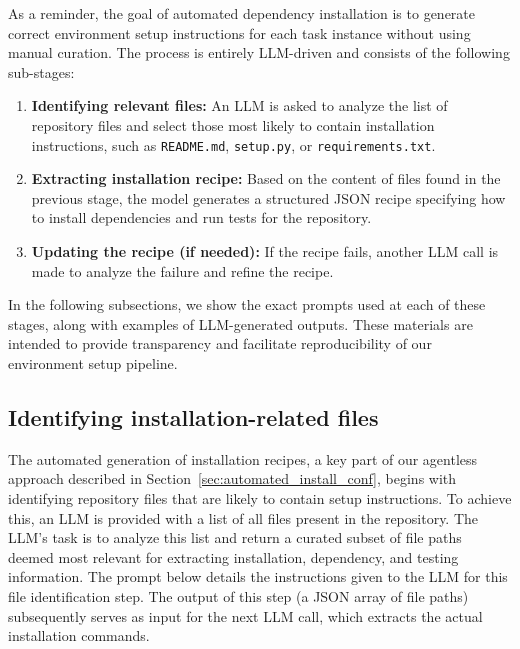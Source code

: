 \documentclass[dandb]{article}
\begin{document}
As a reminder, the goal of automated dependency installation is to generate correct environment setup instructions for each task instance without using manual curation. The process is entirely LLM-driven and consists of the following sub-stages:

\begin{enumerate}
    \item \textbf{Identifying relevant files:} An LLM is asked to analyze the list of repository files and select those most likely to contain installation instructions, such as \texttt{README.md}, \texttt{setup.py}, or \texttt{requirements.txt}.
    \item \textbf{Extracting installation recipe:} Based on the content of files found in the previous stage, the model generates a structured JSON recipe specifying how to install dependencies and run tests for the repository.
    \item \textbf{Updating the recipe (if needed):} If the recipe fails, another LLM call is made to analyze the failure and refine the recipe.
\end{enumerate}

In the following subsections, we show the exact prompts used at each of these stages, along with examples of LLM-generated outputs. These materials are intended to provide transparency and facilitate reproducibility of our environment setup pipeline.

\subsection{Identifying installation-related files}
\label{sec:identify_files}

The automated generation of installation recipes, a key part of our agentless approach described in Section~\ref{sec:automated_install_conf}, begins with identifying repository files that are likely to contain setup instructions. To achieve this, an LLM is provided with a list of all files present in the repository. The LLM's task is to analyze this list and return a curated subset of file paths deemed most relevant for extracting installation, dependency, and testing information. The prompt below details the instructions given to the LLM for this file identification step. The output of this step (a JSON array of file paths) subsequently serves as input for the next LLM call, which extracts the actual installation commands.
\end{document}
